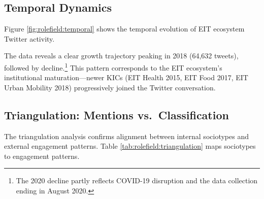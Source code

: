 \documentclass[../main.tex]{subfiles}
\begin{document}
\subsection{Temporal Dynamics}

Figure \ref{fig:rolefield:temporal} shows the temporal evolution of EIT ecosystem Twitter activity.

\begin{center}
\end{center}

The data reveals a clear growth trajectory peaking in 2018 (64,632 tweets), followed by decline.\footnote{The 2020 decline partly reflects COVID-19 disruption and the data collection ending in August 2020.} This pattern corresponds to the EIT ecosystem's institutional maturation---newer KICs (EIT Health 2015, EIT Food 2017, EIT Urban Mobility 2018) progressively joined the Twitter conversation.

\subsection{Triangulation: Mentions vs.\ Classification}

The triangulation analysis confirms alignment between internal sociotypes and external engagement patterns. Table \ref{tab:rolefield:triangulation} maps sociotypes to engagement patterns.
\end{document}
